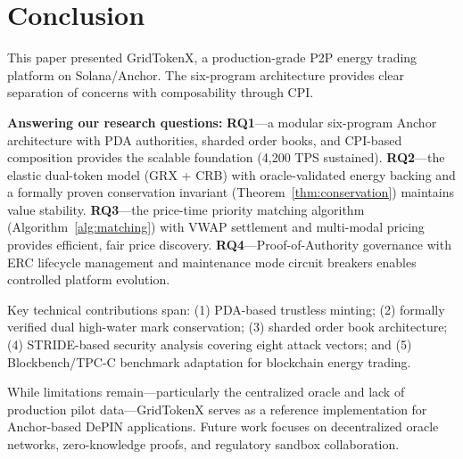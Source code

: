 \documentclass[conference]{IEEEtran}
\begin{document}
\section{Conclusion}
\label{sec:conclusion}

This paper presented GridTokenX, a production-grade P2P energy trading platform on Solana/Anchor. The six-program architecture provides clear separation of concerns with composability through CPI.

\textbf{Answering our research questions:} \textbf{RQ1}---a modular six-program Anchor architecture with PDA authorities, sharded order books, and CPI-based composition provides the scalable foundation (4,200 TPS sustained). \textbf{RQ2}---the elastic dual-token model (GRX + CRB) with oracle-validated energy backing and a formally proven conservation invariant (Theorem~\ref{thm:conservation}) maintains value stability. \textbf{RQ3}---the price-time priority matching algorithm (Algorithm~\ref{alg:matching}) with VWAP settlement and multi-modal pricing provides efficient, fair price discovery. \textbf{RQ4}---Proof-of-Authority governance with ERC lifecycle management and maintenance mode circuit breakers enables controlled platform evolution.

Key technical contributions span: (1) PDA-based trustless minting; (2) formally verified dual high-water mark conservation; (3) sharded order book architecture; (4) STRIDE-based security analysis covering eight attack vectors; and (5) Blockbench/TPC-C benchmark adaptation for blockchain energy trading.

While limitations remain---particularly the centralized oracle and lack of production pilot data---GridTokenX serves as a reference implementation for Anchor-based DePIN applications. Future work focuses on decentralized oracle networks, zero-knowledge proofs, and regulatory sandbox collaboration.

\balance
\end{document}
